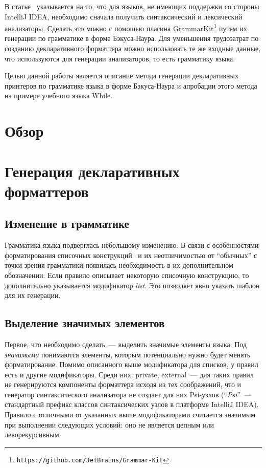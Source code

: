 \documentclass[conference]{IEEEtran}
\begin{document}
В статье~\cite{while} указывается на то, что для языков, не имеющих поддержки со стороны IntelliJ IDEA, необходимо сначала получить синтаксический и лексический анализаторы.
Сделать это можно с помощью плагина GrammarKit\footnote{\texttt{https://github.com/JetBrains/Grammar-Kit}} путем их генерации по грамматике в форме Бэкуса-Наура.
Для уменьшения трудозатрат по созданию декларативного форматтера можно использовать те же входные данные, что используются для генерации анализаторов, то есть грамматику языка.

Целью данной работы является описание метода генерации декларативных принтеров по грамматике языка в форме Бэкуса-Наура и апробации этого метода на примере учебного языка While.


\section{Обзор}


\section{Генерация декларативных форматтеров}
\subsection{Изменение в грамматике}
Грамматика языка подверглась небольшому изменению.
В связи с особенностями форматирования списочных конструкций~\cite{while} и их неотличимостью от ``обычных'' с точки зрения грамматики появилась необходимость в их дополнительном обозначении. 
Если правило описывает некоторую списочную конструкцию, то дополнительно указывается модификатор \emph{list}.
Это позволяет явно указать шаблон для их генерации.

\subsection{Выделение значимых элементов}
Первое, что необходимо сделать~--- выделить значимые элементы языка. 
Под \emph{значимыми} понимаются элементы, которым потенциально нужно будет менять форматирование.
Помимо описанного выше модификатора для списков, у правил есть и другие модификаторы.
Среди них: private, external~--- для таких правил не генерируются компоненты форматтера исходя из тех соображений, что и генератор синтаксического анализатора не создает для них Psi-узлов (``\emph{Psi}''~--- стандартный префикс классов синтаксических узлов в платформе IntelliJ IDEA).
Правило с отличными от указанных выше модификаторами считается значимым при выполнении следующих условий: оно не является цепным или леворекурсивным.
\end{document}
